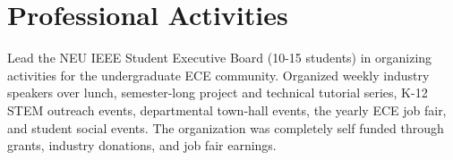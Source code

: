 \section{Professional Activities}

{
  Lead the NEU IEEE Student Executive Board (10-15 students) in organizing activities for the
  undergraduate ECE community. Organized weekly industry speakers over lunch,
  semester-long project and technical tutorial series, K-12 STEM outreach
  events, departmental town-hall events, the yearly ECE job fair, and student
  social events. The organization was completely self funded through grants,
  industry donations, and job fair earnings. \\
}
